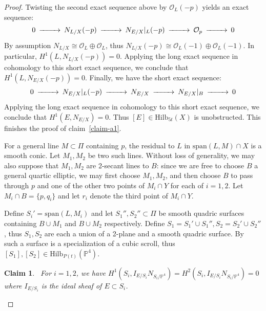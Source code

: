 \documentclass[amssymb,twoside,12 pt,amscd,reqno]{amsart}
\theoremstyle{plain}
\newtheorem{Claim}[thm]{Claim}
\theoremstyle{definition}
\newcommand{\PP}{\mathbb{P}}
\newcommand{\HI}[2]{\text{Hilb}_{#1}(#2)}
\def\ps{\vspace{4pt}}
\newcommand{\OO}{\mathcal O}
\begin{document}
\begin{proof}
\ps

Twisting the second exact sequence above by $\OO_L(-p)$ yields an
exact sequence:
\begin{equation}
\begin{CD}
0 @>>> N_{L/X}(-p) @>>> N_{E/X}|_L(-p) @>>> \OO_p @>>> 0 \end{CD}
\end{equation}
By assumption $N_{L/X} \cong \OO_L \oplus \OO_L$, thus $N_{L/X}(-p)
\cong \OO_L(-1)\oplus \OO_L(-1)$.  In particular, $H^1(L,N_{L/X}(-p))
= 0$.  Applying the long exact sequence in cohomology to this short
exact sequence, we conclude that $H^1(L,N_{E/X}(-p)) = 0$.  Finally,
we have the short exact sequence:
\begin{equation}
\begin{CD}
0 @>>> N_{E/X}|_L(-p) @>>> N_{E/X} @>>> N_{E/X}|_{B} @>>> 0 \end{CD}
\end{equation}
Applying the long exact sequence in cohomology to this short exact
sequence, we conclude that $H^1(E,N_{E/X}) = 0$.  Thus $[E]\in
\HI{5t}{X}$ is unobstructed.  This finishes the proof of
claim~\ref{claim-a1}. 

\ps

For a general line $M\subset \Pi$ containing $p$, the residual to $L$
in $\text{span}(L,M)\cap X$ is a smooth conic.  Let $M_1,M_2$ be two
such lines.
Without loss of
generality, we may also suppose that $M_1, M_2$ are 2-secant lines to
$B$: since we are free to choose $B$ a general quartic elliptic, we may
first choose $M_1, M_2$, and then choose $B$ to pass through $p$ and one of
the other two points of $M_i\cap Y$ for each of $i=1,2$.  Let $M_i\cap B
= \{p, q_i\}$ and let 
$r_i$ denote the third point of $M_i\cap Y$.  

\ps

Define $S_i' =\text{span}(L,M_i)$ and let $S_1'', S_2''\subset \Pi$ be
smooth quadric surfaces containing $B\cup M_1$ and $B\cup M_2$
respectively.  Define 
$S_1=S_1'\cup S_1'', S_2=S_2'\cup S_2''$, thus $S_1, S_2$ are each a union
of a 2-plane and a smooth quadric surface.  
By ~\cite[lemma 6.2]{HRS1}
such a surface is a specialization of a cubic
scroll, thus $[S_1],[S_2]\in \HI{P(t)}{\PP^4}$.  

\begin{Claim}~\label{claim-a2} For
$i=1,2$, we have $H^1(S_i,I_{E/S_i}N_{S_i/\PP^4})=
H^2(S_i,I_{E/S_i}N_{S_i/\PP^4})=0$ where $I_{E/S_i}$ is the ideal
sheaf of $E\subset S_i$.  
\end{Claim}


\end{proof}
\end{document}
